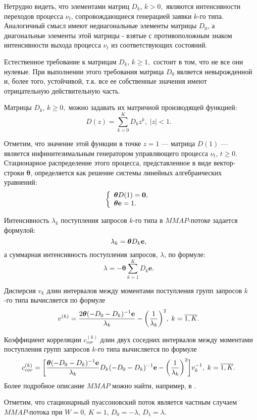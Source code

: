 \documentclass[12pt, a4paper]{article}
\def\bs{\boldsymbol}
\begin{document}
	Нетрудно видеть, что элементами матриц $D_{k}$, $k>0,$ являются
	интенсивности переходов процесса $\nu_{t}$, сопровождающиеся
	генерацией заявки $k$-го типа. Аналогичный смысл имеют
	недиагональные элементы матрицы $D_{0}$, а диагональные элементы
	этой матрицы - взятые с противоположным знаком интенсивности выхода
	процесса $\nu_{t}$ из соответствующих состояний.
	
	Естественное требование к матрицам $D_k$, $k\ge1,$ состоит в том, что
	не все они нулевые. При выполнении этого требования матрица $D_0$
	является невырожденной и, более того, устойчивой, т.к. все ее
	собственные значения имеют отрицательную действительную часть.
	
	Матрицы $D_k$, $k\ge0,$ можно задавать их матричной производящей
	функцией:
	$$
	D(z)=\sum\limits_{k=0}^{K}D_{k}z^k, \; |z|<1.
	$$
	
	Отметим, что значение этой функции в точке $z=1$ --- матрица $D(1)$
	--- является инфинитезимальным генератором управляющего процесса
	$\nu_t$, $t\ge0$. Стационарное распределение этого процесса,
	представленное в виде вектор-строки $\bs{\theta}$, определяется как
	решение системы линейных алгебраических уравнений:
	$$
	\left\{\begin{array}{l}\bs{\theta}D(1)=\bs{0},\\
	\bs{\theta}{\bf e}=1.\end{array}\right.
	$$
	
	Интенсивность $\lambda_{k}$ поступления запросов $k$-го типа
	в $MMAP$-потоке задается формулой:
	$$
	\lambda_{k}=\bs{\theta}D_{k}{\bf e},
	$$
	а суммарная  интенсивность поступления запросов, $\lambda$,
	по формуле:
	$$
	\lambda=-\bs{\theta}\sum\limits_{k=1}^K D_{k}\bs{e}.
	$$
	
	
	
	Дисперсия $v_k$ длин интервалов между моментами  поступления групп
	запросов $k$-го типа вычисляется по формуле
	$$
	v^{(k)} = \frac{2\bs{\theta}(-D_0-
		D_k)^{-1}{\bf e}}{\lambda_k} -
	\biggl(\frac{1}{\lambda_k}\biggr)^2,\; k=\overline{1,K}.
	$$
	
	
	Коэффициент корреляции  $c_{cor}^{(k)}$ длин двух соседних
	интервалов между моментами  поступления групп запросов $k$-го типа
	вычисляется по формуле
	$$
	c_{cor}^{(k)}=\biggl[\frac{\bs{\theta}(-D_0-
		D_k)^{-1}{\bf e}}{\lambda_k} D_k(-D_0-D_k)^{-1}{\bf
		e}-\biggl(\frac{1}{\lambda_k}\biggr)^2\biggr]v_k^{-1},\;
	k=\overline{1,K}.
	$$
	Более подробное описание $MMAP$  можно найти, например, в \cite{he}.
	
	Отметим, что стационарный пуассоновский поток является частным случаем
	$MMAP$-потока при $ W=0$, $K=1$, $D_0=-\lambda$, $D_1=\lambda$.
	
\end{document}
